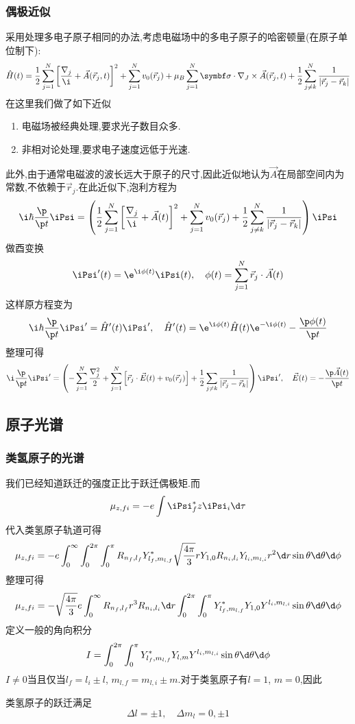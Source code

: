 \documentclass{ctexbook}
\begin{document}
\subsubsection{偶极近似}
采用处理多电子原子相同的办法,考虑电磁场中的多电子原子的哈密顿量(在原子单位制下):
\[\hat{H}(t)=\dfrac12\sum_{j=1}^{N}\left[\dfrac{\nabla_j}{\i}+\vec{A}(\vec{r}_j,t)\right]^2+\sum_{j=1}^{N}v_0(\vec{r}_j)+\mu_B\sum_{j=1}^{N}\symbf\sigma\cdot\nabla_J\times\vec{A}(\vec{r}_j,t)+\dfrac12\sum_{j\neq k}^{N}\dfrac{1}{\left|\vec{r}_j-\vec{r}_k\right|}\]
在这里我们做了如下近似
\begin{enumerate}[label=(\alph*)]
  	\item 电磁场被经典处理,要求光子数目众多.
  	\item 非相对论处理,要求电子速度远低于光速.
\end{enumerate}
此外,由于通常电磁波的波长远大于原子的尺寸,因此近似地认为$\vec{A}$在局部空间内为常数,不依赖于$\vec{r}_j$.在此近似下,泡利方程为
\[\i\hbar\dfrac{\p}{\p t}\iPsi=\left(\dfrac12\sum_{j=1}^{N}\left[\dfrac{\nabla_j}{\i}+\vec{A}(t)\right]^2+\sum_{j=1}^{N}v_0(\vec{r}_j)+\dfrac12\sum_{j\neq k}^{N}\dfrac{1}{\left|\vec{r}_j-\vec{r}_k\right|}\right)\iPsi\]
做酉变换
\[\iPsi'(t)=\e^{\i\phi(t)}\iPsi(t),\quad\phi(t)=\sum_{j=1}^{N}\vec{r}_j\cdot\vec{A}(t)\]
这样原方程变为
\[\i\hbar\dfrac{\p}{\p t}\iPsi'=\hat{H}'(t)\iPsi',\quad\hat{H}'(t)=\e^{\i\phi(t)}\hat{H}(t)\e^{-\i\phi(t)}-\dfrac{\p\phi(t)}{\p t}\]
整理可得
\[\i\dfrac{\p}{\p t}\iPsi'=\left(-\sum_{j=1}^{N}\dfrac{\nabla_j^2}{2}+\sum_{j=1}^{N}\left[\vec{r}_j\cdot\vec{E}(t)+v_0(\vec{r}_j)\right]+\dfrac{1}{2}\sum_{j\neq k}\dfrac{1}{\left|\vec{r}_j-\vec{r}_k\right|}\right)\iPsi',\quad\vec{E}(t)=-\dfrac{\p\vec{A}(t)}{\p t}\]
\subsection{原子光谱}
\subsubsection{类氢原子的光谱}
我们已经知道跃迁的强度正比于跃迁偶极矩.而
\[\mu_{z,fi}=-e\int\iPsi_f^\ast z\iPsi_i\d\tau\]
代入类氢原子轨道可得
\[\mu_{z,fi}=-e\int_0^{\infty}\int_0^{2\pi}\int_0^\pi R_{n_f,l_f}Y_{l_f,m_{l,f}}^\ast\sqrt{\dfrac{4\pi}{3}}rY_{1,0}R_{n_i,l_i}Y_{l_i,m_{l,i}}r^2\d r\sin\theta\d\theta\d\phi\]
整理可得
\[\mu_{z,fi}=-\sqrt{\dfrac{4\pi}{3}}e\int_0^{\infty}R_{n_f,l_f}r^3R_{n_i,l_i}\d r\int_0^{2\pi}\int_0^\pi Y_{l_f,m_{l,f}}^\ast Y_{1,0}Y^{l_i,m_{l,i}}\sin\theta\d\theta\d\phi\]
定义一般的角向积分
\[I=\int_0^{2\pi}\int_0^\pi Y_{l_f,m_{l,f}}^\ast Y_{l,m}Y^{l_i,m_{l,i}}\sin\theta\d\theta\d\phi\]
$I\neq0$当且仅当$l_f=l_i\pm l$, $m_{l,f}=m_{l,i}\pm m$.对于类氢原子有$l=1$, $m=0$,因此
\begin{theorem}[类氢原子的跃迁选律]
	类氢原子的跃迁满足
	\[\Delta l=\pm1,\quad\Delta m_l=0,\pm1\]
\end{theorem}
\end{document}
